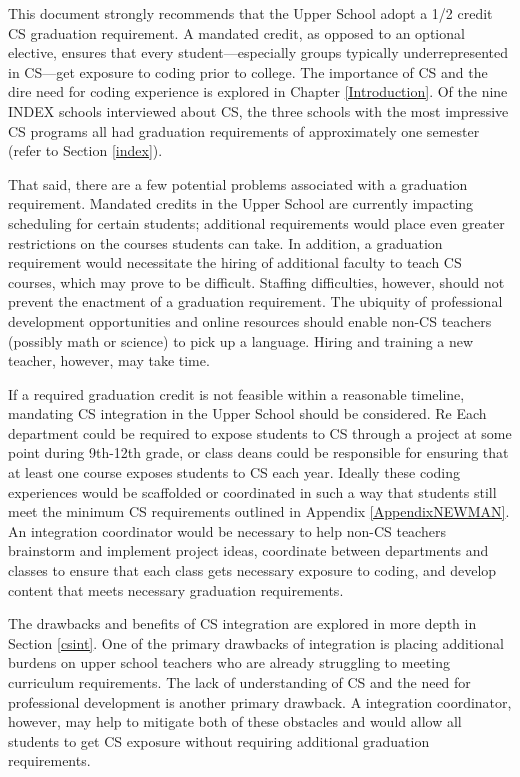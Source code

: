 This document strongly recommends that the Upper School adopt a 1/2 credit CS graduation requirement. A mandated credit, as opposed to an optional elective, ensures that every student---especially groups typically underrepresented in CS---get exposure to coding prior to college. The importance of CS and the dire need for coding experience is explored in Chapter \ref{Introduction}. Of the nine INDEX schools interviewed about CS, the three schools with the most impressive CS programs all had graduation requirements of approximately one semester (refer to Section \ref{index}).\par
That said, there are a few potential problems associated with a graduation requirement. Mandated credits in the Upper School are currently impacting scheduling for certain students; additional requirements would place even greater restrictions on the courses students can take. In addition, a graduation requirement would necessitate the hiring of additional faculty to teach CS courses, which may prove to be difficult. Staffing difficulties, however, should not prevent the enactment of a graduation requirement. The ubiquity of professional development opportunities and online resources should enable non-CS teachers (possibly math or science) to pick up a language. Hiring and training a new teacher, however, may take time.\par
If a required graduation credit is not feasible within a reasonable timeline, mandating CS integration in the Upper School should be considered. Re Each department could be required to expose students to CS through a project at some point during 9th-12th grade, or class deans could be responsible for ensuring that at least one course exposes students to CS each year. Ideally these coding experiences would be scaffolded or coordinated in such a way that students still meet the minimum CS requirements outlined in Appendix \ref{AppendixNEWMAN}. An integration coordinator would be necessary to help non-CS teachers brainstorm and implement project ideas, coordinate between departments and classes to ensure that each class gets necessary exposure to coding, and develop content that meets necessary graduation requirements.\par
The drawbacks and benefits of CS integration are explored in more depth in Section \ref{csint}. One of the primary drawbacks of integration is placing additional burdens on upper school teachers who are already struggling to meeting curriculum requirements. The lack of understanding of CS and the need for professional development is another primary drawback. A integration coordinator, however, may help to mitigate both of these obstacles and would allow all students to get CS exposure without requiring additional graduation requirements.\par

